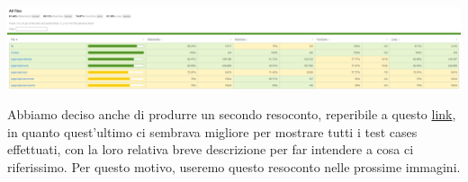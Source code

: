 \begin{center}
        \includegraphics[width=1\textwidth, height=0.1\textheight]{img/png/tests/test_totale_1.png}
\end{center}

Abbiamo deciso anche di produrre un secondo resoconto, reperibile a questo \href{https://plan-it.it/test-report.html} {link}, in quanto quest'ultimo ci sembrava migliore per mostrare tutti i test cases effettuati, con la loro relativa breve descrizione per far intendere a cosa ci riferissimo. Per questo motivo, useremo questo resoconto nelle prossime immagini.


